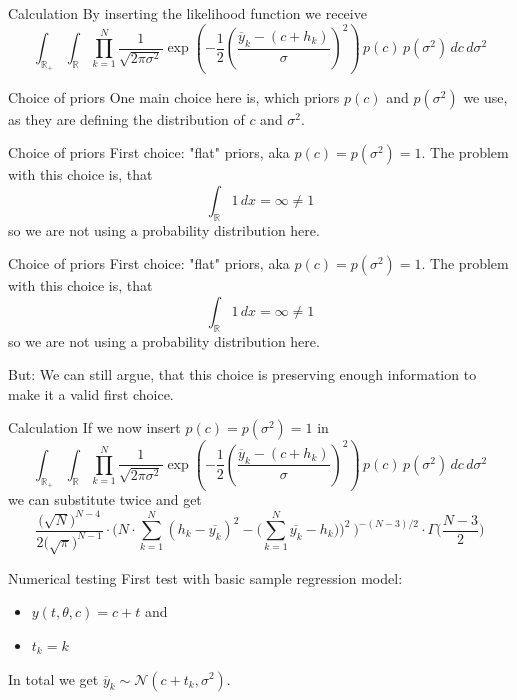 \documentclass{beamer}
\newcommand{\s}{\sigma^2}
\begin{document}
	\begin{frame}{Calculation}
		By inserting the likelihood function we receive
		\[
			\int_{\mathbb{R}_+} \int_\mathbb{R} \prod_{k = 1}^N \frac{1}{\sqrt{2 
			\pi \s}} \exp\left(-\frac{1}{2} \left(\frac{\overline{y}_{k} -\left( c 
			+ h_{k} \right)}{\sigma} \right)^2\right) \, p(c) \, p(\s) \, dc 
			\, d\s
		\]
	\end{frame}


	\begin{frame}{Choice of priors}
		One main choice here is, which priors $p(c)$ and $p(\s)$ we use, as they 
		are defining the distribution of $c$ and $\s$.
	\end{frame}

	\begin{frame}{Choice of priors}
		First choice: "flat" priors, aka $p(c) = p(\s) = 1$. The problem with this
		choice is, that
		\[
			\int_\mathbb{R} 1 \, dx = \infty \neq 1
		\]
		so we are not using a probability distribution here.
	\end{frame}

	\begin{frame}{Choice of priors}
		First choice: "flat" priors, aka $p(c) = p(\s) = 1$. The problem with this
		choice is, that
		\[
			\int_\mathbb{R} 1 \, dx = \infty \neq 1
		\]
		so we are not using a probability distribution here.
	
		\vspace{1cm}
		\alert{But}: We can still argue, that this choice is preserving enough 
		information to make it a valid first choice.
	\end{frame}

	\begin{frame}{Calculation}
		If we now insert $p(c) = p(\s) = 1$ in
		\[
			\int_{\mathbb{R}_+} \int_\mathbb{R} \prod_{k = 1}^N \frac{1}{\sqrt{2 \pi \s}} \exp\left(-\frac{1}{2} 
			\left(\frac{\overline{y}_{k} -\left( c + h_{k} \right)}{\sigma}
		 	\right)^2\right) \, p(c) \, p(\s) \, dc \, d\s
		\]
		we can substitute twice and get
		\[
			\frac{\bigl(\sqrt{N}\bigr)^{N-4}}{2\bigl(\sqrt{\pi}\bigr)^{N-1}} \cdot 
			\Biggl(N \cdot \sum_{k = 1}^N (h_k - \overline{y_k})^2 - \Biggl
			(\sum_{k = 1}^N \overline{y_k} - h_k)\Biggr)^2 \ \Biggr)^{-(N-3)/2} 
			\cdot \Gamma \biggl(\frac{N-3}{2}\biggr)
		\]
	\end{frame}

	\begin{frame}{Numerical testing}
		First test with basic sample regression model:
		\begin{itemize}
			\item $y(t,\theta,c) = c + t$ and
			\item $t_k = k$
		\end{itemize}
		In total we get $\overline{y}_k \sim \mathcal{N}(c + t_k,\s)$.
	\end{frame}
\end{document}
